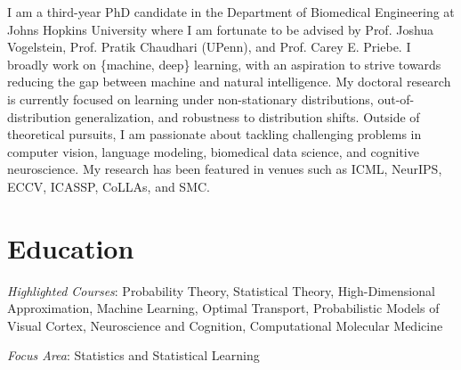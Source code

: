 \documentclass[10pt,a4paper,sans]{moderncv} %
\begin{document}
\makecvtitle %
I am a third-year PhD candidate in the Department of Biomedical Engineering at Johns Hopkins University 
where I am fortunate to be advised by Prof. Joshua Vogelstein, Prof. Pratik Chaudhari (UPenn), and Prof. Carey E. Priebe. 
I broadly work on \{machine, deep\} learning, with an aspiration to strive towards reducing the gap between 
machine and natural intelligence. My doctoral research is currently focused on learning under non-stationary 
distributions, out-of-distribution generalization, and robustness to distribution shifts. Outside of theoretical 
pursuits, I am passionate about tackling challenging problems in computer vision, language modeling, biomedical data science, and 
cognitive neuroscience. My research has been featured in venues such as ICML, NeurIPS, ECCV, ICASSP, CoLLAs, and SMC.


\section{Education}
{\textit{Highlighted Courses}: Probability Theory, Statistical Theory, High-Dimensional Approximation, Machine Learning, Optimal Transport, Probabilistic Models of Visual Cortex, Neuroscience and Cognition, Computational Molecular Medicine}

{\textit{Focus Area}: Statistics and Statistical Learning}


\let\thefootnote\relax{}
\end{document}
